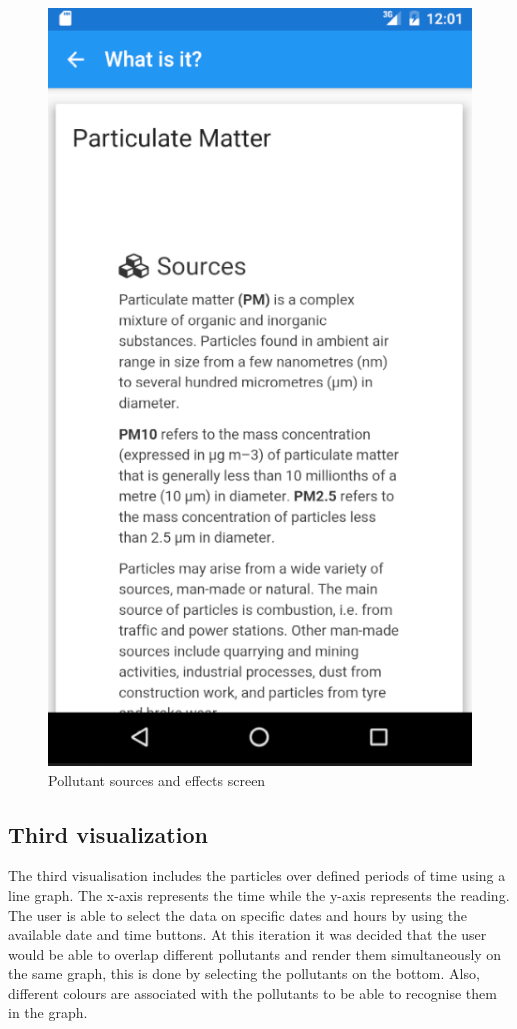 \begin{figure}[H]
\begin{adjustbox}{width=.3\textwidth,center=\textwidth}
  \centering
  \includegraphics[scale=1]{images/second_visualization_sub_screen.png}
\end{adjustbox}
  \caption[Pollutant sources and effects screen]{Pollutant sources and effects screen}
  \label{fig:second_visualization_sub_screen}
\end{figure}

\subsection{Third visualization}
The third visualisation includes the particles over defined periods of time using a line graph. The x-axis represents the time while the y-axis represents the reading. The user is able to select the data on specific dates and hours by using the available date and time buttons. At this iteration it was decided that the user would be able to overlap different pollutants and render them simultaneously on the same graph, this is done by selecting the pollutants on the bottom. Also, different colours are associated with the pollutants to be able to recognise them in the graph.

